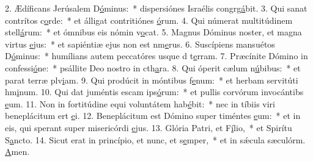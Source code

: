 2. Ædíficans Jerúsalem D\uline{ó}minus:~* dispersiónes Israélis congrg\uline{á}bit.
3. Qui sanat contrítos c\uline{o}rde:~* et álligat contritiónes \uline{ó}rum.
4. Qui númerat multitúdinem stell\uline{á}rum:~* et ómnibus eis nómin v\uline{o}cat.
5. Magnus Dóminus noster, et magna virtus \uline{e}jus:~* et sapiéntiæ ejus non est nm\uline{e}rus.
6. Suscípiens mansuétos D\uline{ó}minus:~* humílians autem peccatóres usque d t\uline{e}rram.
7. Præcínite Dómino in confessi\uline{ó}ne:~* psállite Deo nostro in cth\uline{a}ra.
8. Qui óperit cælum n\uline{ú}bibus:~* et parat terræ plv\uline{i}am.
9. Qui prodúcit in móntibus f\uline{e}num:~* et herbam servitúti hm\uline{i}num.
10. Qui dat juméntis escam ips\uline{ó}rum:~* et pullis corvórum invocántibs \uline{e}um.
11. Non in fortitúdine equi voluntátem hab\uline{é}bit:~* nec in tíbiis viri beneplácitum ert \uline{e}i.
12. Beneplácitum est Dómino super timéntes \uline{e}um:~* et in eis, qui sperant super misericórdi \uline{e}jus.
13. Glória Patri, et F\uline{í}lio,~* et Spirítu S\uline{a}ncto.
14. Sicut erat in princípio, et nunc, et s\uline{e}mper,~* et in sǽcula sæculórm. \uline{A}men.
